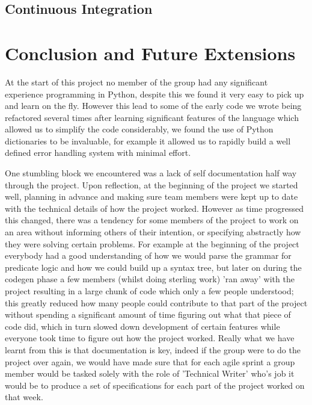 \documentclass[a4paper, 11pt]{article}
\begin{document}
  \subsection{Continuous Integration}

\section{Conclusion and Future Extensions}

  At the start of this project no member of the group had any significant
  experience programming in Python, despite this we found it very easy to pick
  up and learn on the fly. However this lead to some of the early code we
  wrote being refactored several times after learning significant features
  of the language which allowed us to simplify the code considerably, we found 
  the use of Python dictionaries to be invaluable, for example it allowed us to 
  rapidly build a well defined error handling system with minimal effort.
  
  
  One stumbling block we encountered was a lack of self documentation half way
  through the project. Upon reflection, at the beginning of the project we 
  started well, planning in advance and making sure team members were kept up 
  to date with the technical details of how the project worked. However as time 
  progressed this changed, there was a tendency for some members of the project 
  to work on an area without informing others of their intention, or specifying 
  abstractly how they were solving certain problems. For example at the beginning 
  of the project everybody had a good understanding of how we would parse the 
  grammar for predicate logic and how we could build up a syntax tree, but later 
  on during the codegen phase a few members (whilst doing sterling work) 'ran away'
  with the project resulting in a large chunk of code which only a few people
  understood; this greatly reduced how many people could contribute to that part
  of the project without spending a significant amount of time figuring out what
  that piece of code did, which in turn slowed down development of certain
  features while everyone took time to figure out how the project worked.
  Really what we have learnt from this is that documentation is key, indeed if the
  group were to do the project over again, we would have made sure that for each
  agile sprint a group member would be tasked solely with the role of 'Technical
  Writer' who's job it would be to produce a set of specifications for each part
  of the project worked on that week. 
\end{document}
